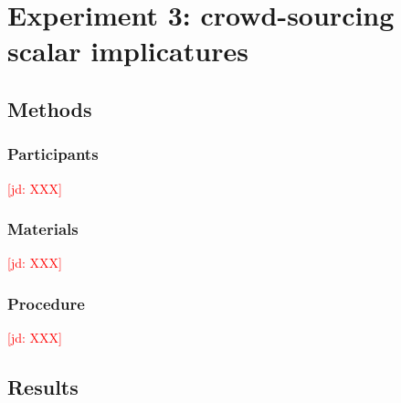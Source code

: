 \documentclass[11pt,letterpaper]{article}
\newcommand{\jd}[1]{\textcolor{Red}{[jd: #1]}}
\begin{document}
%
%
%



\section{Experiment 3: crowd-sourcing scalar implicatures}


\subsection{Methods}

\subsubsection{Participants}

\jd{XXX}

\subsubsection{Materials}

\jd{XXX}

\subsubsection{Procedure}

\jd{XXX}

\subsection{Results}
\end{document}
